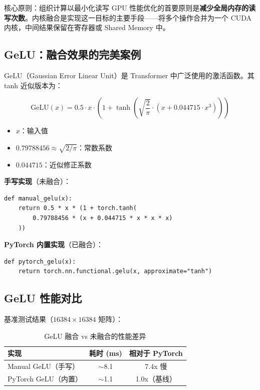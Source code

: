\documentclass[a4paper]{article}
\begin{document}
\begin{importantbox}{核心原则：组织计算以最小化读写}
GPU 性能优化的首要原则是\textbf{减少全局内存的读写次数}。内核融合是实现这一目标的主要手段——将多个操作合并为一个 CUDA 内核，中间结果保留在寄存器或 Shared Memory 中。
\end{importantbox}

\subsection{GeLU：融合效果的完美案例}

GeLU（Gaussian Error Linear Unit）是 Transformer 中广泛使用的激活函数。其 tanh 近似版本为：

$$\text{GeLU}(x) = 0.5 \cdot x \cdot \left(1 + \tanh\left(\sqrt{\frac{2}{\pi}} \cdot (x + 0.044715 \cdot x^3)\right)\right)$$

\begin{itemize}
    \item $x$：输入值
    \item $0.79788456 \approx \sqrt{2/\pi}$：常数系数
    \item $0.044715$：近似修正系数
\end{itemize}

\textbf{手写实现}（未融合）：

\begin{lstlisting}[caption={手写 GeLU（多个独立 CUDA 内核）}]
def manual_gelu(x):
    return 0.5 * x * (1 + torch.tanh(
        0.79788456 * (x + 0.044715 * x * x * x)
    ))
\end{lstlisting}

\textbf{PyTorch 内置实现}（已融合）：

\begin{lstlisting}[caption={PyTorch 内置 GeLU（单个 CUDA 内核）}]
def pytorch_gelu(x):
    return torch.nn.functional.gelu(x, approximate="tanh")
\end{lstlisting}

\subsection{GeLU 性能对比}

基准测试结果（$16384 \times 16384$ 矩阵）：

\begin{table}[H]
\centering
\begin{tabular}{lcc}
\toprule
\textbf{实现} & \textbf{耗时 (ms)} & \textbf{相对于 PyTorch} \\
\midrule
Manual GeLU（手写） & $\sim$8.1 & 7.4x 慢 \\
PyTorch GeLU（内置） & $\sim$1.1 & 1.0x（基线）\\
\bottomrule
\end{tabular}
\caption{GeLU 融合 vs 未融合的性能差异}
\end{table}
\end{document}
